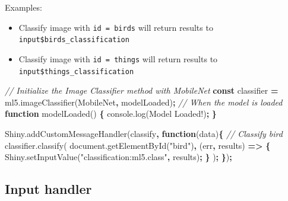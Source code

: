 \documentclass[
  10pt,
]{krantz}
\makeatletter
\newenvironment{Shaded}{\begin{snugshade}}{\end{snugshade}}
\newcommand{\AttributeTok}[1]{\textcolor[rgb]{0.61,0.61,0.61}{#1}}
\newcommand{\CommentTok}[1]{\textcolor[rgb]{0.37,0.37,0.37}{\textit{#1}}}
\newcommand{\KeywordTok}[1]{\textcolor[rgb]{0.27,0.27,0.27}{\textbf{#1}}}
\newcommand{\NormalTok}[1]{#1}
\newcommand{\OperatorTok}[1]{\textcolor[rgb]{0.43,0.43,0.43}{\textbf{#1}}}
\newcommand{\StringTok}[1]{\textcolor[rgb]{0.5,0.5,0.5}{#1}}
\newcommand{\VariableTok}[1]{\textcolor[rgb]{0,0,0}{#1}}
\providecommand{\tightlist}{%
  \setlength{\itemsep}{0pt}\setlength{\parskip}{0pt}}
\newenvironment{kframe}{%
\medskip{}
\setlength{\fboxsep}{.8em}
 \def\at@end@of@kframe{}%
 \ifinner\ifhmode%
  \def\at@end@of@kframe{\end{minipage}}%
  \begin{minipage}{\columnwidth}%
 \fi\fi%
 \def\FrameCommand##1{\hskip\@totalleftmargin \hskip-\fboxsep
 \colorbox{shadecolor}{##1}\hskip-\fboxsep
     \hskip-\linewidth \hskip-\@totalleftmargin \hskip\columnwidth}%
 \MakeFramed {\advance\hsize-\width
   \@totalleftmargin\z@ \linewidth\hsize
   \@setminipage}}%
 {\par\unskip\endMakeFramed%
 \at@end@of@kframe}
\renewenvironment{Shaded}{\begin{kframe}}{\end{kframe}}
\makeatother
\begin{document}
Examples:

\begin{itemize}
\tightlist
\item
  Classify image with \texttt{id\ =\ \textquotesingle{}birds\textquotesingle{}} will return results to \texttt{input\$birds\_classification}
\item
  Classify image with \texttt{id\ =\ \textquotesingle{}things\textquotesingle{}} will return results to \texttt{input\$things\_classification}
\end{itemize}

\begin{Shaded}
\begin{Highlighting}[]
\CommentTok{// Initialize the Image Classifier method with MobileNet}
\KeywordTok{const}\NormalTok{ classifier }\OperatorTok{=} \VariableTok{ml5}\NormalTok{.}\AttributeTok{imageClassifier}\NormalTok{(}\StringTok{\textquotesingle{}MobileNet\textquotesingle{}}\OperatorTok{,}\NormalTok{ modelLoaded)}\OperatorTok{;}
\CommentTok{// When the model is loaded}
\KeywordTok{function} \AttributeTok{modelLoaded}\NormalTok{() }\OperatorTok{\{}
  \VariableTok{console}\NormalTok{.}\AttributeTok{log}\NormalTok{(}\StringTok{\textquotesingle{}Model Loaded!\textquotesingle{}}\NormalTok{)}\OperatorTok{;}
\OperatorTok{\}}

\VariableTok{Shiny}\NormalTok{.}\AttributeTok{addCustomMessageHandler}\NormalTok{(}\StringTok{\textquotesingle{}classify\textquotesingle{}}\OperatorTok{,} \KeywordTok{function}\NormalTok{(data)}\OperatorTok{\{}
  \CommentTok{// Classify bird}
  \VariableTok{classifier}\NormalTok{.}\AttributeTok{classify}\NormalTok{(}
    \VariableTok{document}\NormalTok{.}\AttributeTok{getElementById}\NormalTok{(}\StringTok{"bird"}\NormalTok{)}\OperatorTok{,}\NormalTok{ (err}\OperatorTok{,}\NormalTok{ results) }\KeywordTok{=>} \OperatorTok{\{}
      \VariableTok{Shiny}\NormalTok{.}\AttributeTok{setInputValue}\NormalTok{(}\StringTok{"classification:ml5.class"}\OperatorTok{,}\NormalTok{ results)}\OperatorTok{;}
    \OperatorTok{\}}
\NormalTok{  )}\OperatorTok{;}
\OperatorTok{\}}\NormalTok{)}\OperatorTok{;}
\end{Highlighting}
\end{Shaded}

\hypertarget{shiny-complete-pkg-input-handler}{%
\subsection{Input handler}\label{shiny-complete-pkg-input-handler}}
\end{document}
